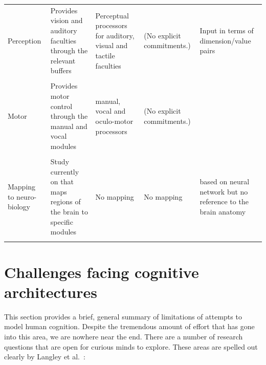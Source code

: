 \begin{lscapenum}
\begin{table}
\begin{tabular}{p{2.5cm}p{3.7cm}p{3.7cm}p{3.7cm}p{3.7cm}}
      Perception & Provides vision and auditory faculties through the
      relevant buffers& Perceptual processors for auditory, visual and
      tactile faculties & (No explicit commitments.) & Input in terms of dimension/value pairs\\
      & & & &\\
      
      Motor & Provides motor control through the manual and vocal modules&
      manual, vocal and oculo-motor processors
      & (No explicit commitments.) &\\
      & & & &\\
      Mapping to neuro-biology & Study currently on
      that maps regions of the brain to specific modules& No mapping& No
      mapping& based on neural network but no reference to the brain anatomy\cite{Chong:2007aa} \\
      & & & &\\

    \end{tabular}
  \end{table}
\end{lscapenum}



\section{Challenges facing cognitive architectures}

This section provides a brief, general summary of limitations
of attempts to model human cognition.
%
%
Despite the tremendous amount of effort that has gone into this area, we
are nowhere near the end. There are a number of research questions
that are open for curious minds to explore. These areas are spelled
out clearly by Langley et al.~\cite{citeulike:4182324}:


